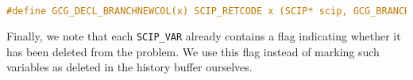 \begin{lstlisting}[language=C, caption=Branching Rule Interface Extension]
#define GCG_DECL_BRANCHNEWCOL(x) SCIP_RETCODE x (SCIP* scip, GCG_BRANCHDATA* branchdata, SCIP_VAR* mastervar)
\end{lstlisting}

Finally, we note that each \texttt{SCIP\_VAR} already contains a flag indicating whether it has been deleted from the problem. We use this flag instead of marking such variables as deleted in the history buffer ourselves.
